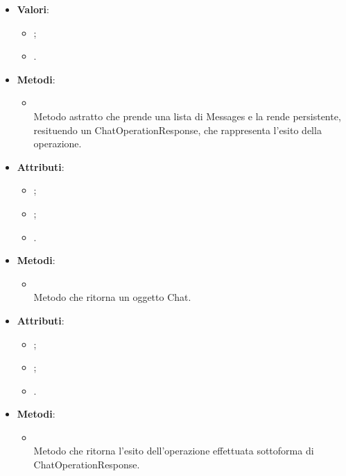 \documentclass[10pt, a4paper]{article}
\begin{document}
\label{MessageSenderDettaglio}
\begin{itemize}
    \item \textbf{Valori}:
    \begin{itemize}
        \item {};
        \item {}.
    \end{itemize}
\end{itemize}

\label{PersistChatPortDettaglio}
\begin{itemize}
    \item \textbf{Metodi}:
    \begin{itemize}
        \item {}\\
        Metodo astratto che prende una lista di Messages e la rende persistente, resituendo un ChatOperationResponse, che rappresenta l'esito della operazione.
    \end{itemize}
\end{itemize}

\label{PostgresChatDettaglio}
\begin{itemize}
    \item \textbf{Attributi}:
    \begin{itemize}
        \item {};
        \item {};
        \item {}.     
    \end{itemize}    
    \item \textbf{Metodi}:
    \begin{itemize}
        \item {}\\
        Metodo che ritorna un oggetto Chat.
    \end{itemize}
\end{itemize}


\label{PostgresChatOperationResponseDettaglio}
\begin{itemize}
    \item \textbf{Attributi}:
    \begin{itemize}
        \item {};
        \item {};
        \item {}.
    \end{itemize}
    \item \textbf{Metodi}:
    \begin{itemize}
        \item {} \\
        Metodo che ritorna l'esito dell'operazione effettuata sottoforma di ChatOperationResponse.
    \end{itemize}
\end{itemize}
\end{document}
